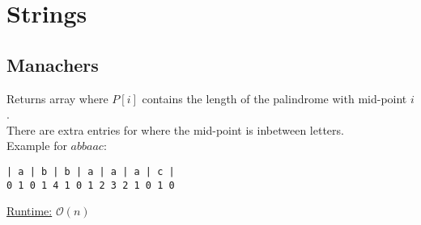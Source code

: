 \section{Strings}
\subsection{Manachers}
Returns array where $P[i]$ contains the length of the palindrome with mid-point $i$.\\
There are extra entries for where the mid-point is inbetween letters.\\
Example for $abbaac$:
\begin{lstlisting}
| a | b | b | a | a | a | c |
0 1 0 1 4 1 0 1 2 3 2 1 0 1 0
\end{lstlisting}
\underline{Runtime:} $\mathcal{O}(n)$
